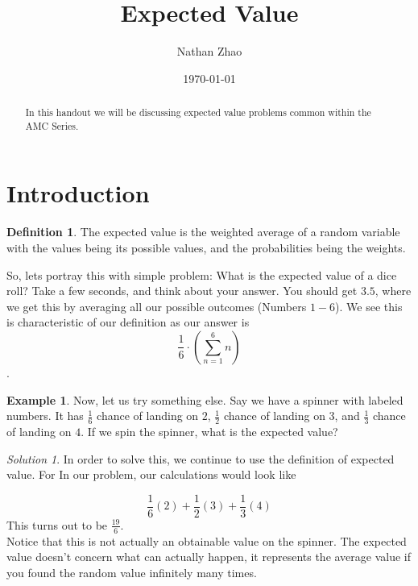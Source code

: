 \documentclass[letterpaper]{article}
\title{Expected Value}
\author{Nathan Zhao}
\date{\today}
\theoremstyle{definition}
\newtheorem{example}[thm]{Example}
\newtheorem{definition}[thm]{Definition}
\theoremstyle{remark}
\newtheorem*{solution}{Solution}
\theoremstyle{definition}
\begin{document}
\maketitle

\begin{abstract}
In this handout we will be discussing expected value problems common within the AMC Series.
\end{abstract}

\section{Introduction}
\begin{mdframed}
    \begin{definition}
        The expected value is the weighted average of a random variable with the values being its possible values, and the probabilities being the weights.
    \end{definition}
\end{mdframed}

So, lets portray this with simple problem: What is the expected value of a dice roll? Take a few seconds, and think about your answer. You should get $3.5$, where we get this by averaging all our possible outcomes (Numbers $1-6$). We see this is characteristic of our definition as our answer is $$\frac{1}{6} \cdot \left(\sum_{n=1}^{6} n \right)$$.

\begin{example}
Now, let us try something else. Say we have a spinner with labeled numbers. It has $\frac{1}{6}$ chance of landing on $2$, $\frac{1}{2}$ chance of landing on $3$, and $\frac{1}{3}$ chance of landing on $4$. If we spin the spinner, what is the expected value?
\end{example}

\begin{solution}
In order to solve this, we continue to use the definition of expected value. For In our problem, our calculations would look like

$$\frac{1}{6}(2) + \frac{1}{2}(3) + \frac{1}{3}(4)$$
This turns out to be $\boxed{\frac{19}{6}}$.\\
Notice that this is not actually an obtainable value on the spinner. The expected value doesn't concern what can actually happen, it represents the average value if you found the random value infinitely many times.\\
\end{solution}

\noindent
\end{document}
